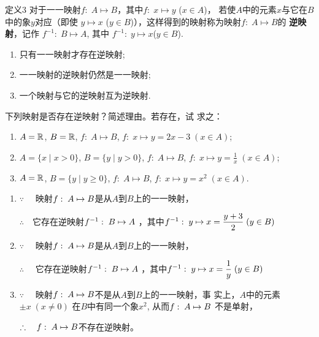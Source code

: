 \begin{thm}{定义3}
     对于一一映射$f:\; A\mapsto  B$，其中$f:\; x\mapsto  y$ 
($x\in A$)，
若使$A$中的元素$x$与它在$B$中的象$y$对应（即使
$y\mapsto  x$ ($y\in B$)），这样得到的映射称为映射$f:\; A\mapsto  B$的
\textbf{逆映射}，记作
$f^{-1}:\; B\mapsto  A$, 其中
$f^{-1}:\; y\mapsto  x$($y\in B$).
\end{thm}

\begin{note}
\begin{enumerate}
    \item 只有一一映射才存在逆映射;
    \item  一一映射的逆映射仍然是一一映射;
    \item  一个映射与它的逆映射互为逆映射.
\end{enumerate}
\end{note}

\begin{example}
    下列映射是否存在逆映射？简述理由。若存在，试
求之：
\begin{enumerate}[(1)]
    \item $A=\mathbb{R}$, $B=\mathbb{R}$, $f:\; A\mapsto  B$, $f:\; x\mapsto  y=2x-3\; (x\in A)$;
    \item $A=\{x\mid x>0\}$, $B=\{y\mid y>0\}$, $f:\; A\mapsto  B$, $f:\; x\mapsto  y=\frac{1}{x}\; (x\in A )$;
    \item $A=\mathbb{R}$, $B=\{y\mid y\ge 0\}$, $f:\; A\mapsto  B$, $f:\; x\mapsto  y=x^2\; (x\in A)$.
\end{enumerate}
\end{example}

\begin{solution}
\begin{enumerate}[(1)]
    \item $\because\quad$ 映射$f:\; A\mapsto B$是从$A$到$B$上的一一映射，
    
    $\therefore\quad $它存在逆映射$f^{-1}:\; B\mapsto A$
    ，其中$f^{-1}:\; y\mapsto x=\dfrac{y+3}{2}\; (y\in B)$

    \item $\because\quad$ 映射$f:\; A\mapsto B$是从$A$到$B$上的一一映射，
   
    $\therefore\quad $ 它存在逆映射$f^{-1}:\; B\mapsto A$
    ，其中$f^{-1}:\; y\mapsto x=\dfrac{1}{y}\; (y\in B)$

    \item $\because\quad$ 映射$f:\; A\mapsto B$不是从$A$到$B$上的一一映射，事
    实上，$A$中的元素$\pm x\; (x\ne 0)$
    在$B$中有同一个象$x^2$, 从而$f:\; A\mapsto B$
    不是单射，

$\therefore\quad f:\; A\mapsto B$不存在逆映射。
\end{enumerate}
\end{solution}

